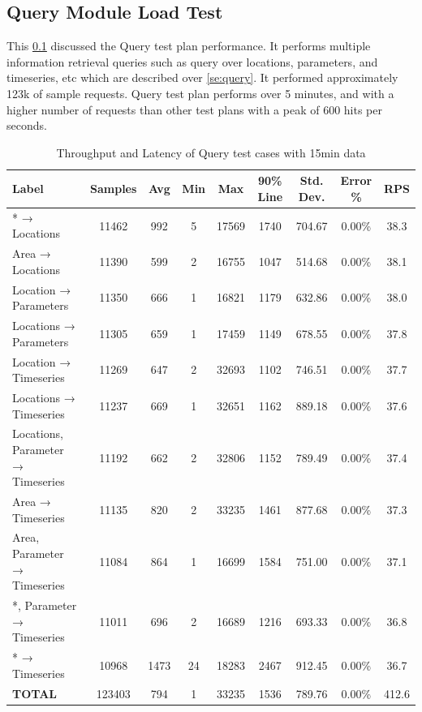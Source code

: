 \subsection{Query Module Load Test}
\label{subse:obs_test_plan_query_15min}

This \cref{subse:obs_test_plan_query_15min} discussed the Query test plan performance. It performs multiple information retrieval queries such as query over locations, parameters, and timeseries, etc which are described over \cref{se:query}. It performed approximately 123k of sample requests.
Query test plan performs over 5 minutes, and with a higher number of requests than other test plans with a peak of 600 hits per seconds.

\begin{table}[ht]
\caption{Throughput and Latency of Query test cases with 15min data}
\footnotesize
\begin{tabulary}{\linewidth}{|L|C|C|C|C|C|C|C|C|}
\hline
Label & Samples & Avg & Min & Max & 90\% Line & Std. Dev. & Error \% & RPS \\ \hline
* → Locations & 11462 & 992 & 5 & 17569 & 1740 & 704.67 & 0.00\% & 38.3 \\ \hline
Area → Locations & 11390 & 599 & 2 & 16755 & 1047 & 514.68 & 0.00\% & 38.1 \\ \hline
Location → Parameters & 11350 & 666 & 1 & 16821 & 1179 & 632.86 & 0.00\% & 38.0 \\ \hline
Locations → Parameters & 11305 & 659 & 1 & 17459 & 1149 & 678.55 & 0.00\% & 37.8 \\ \hline
Location → Timeseries & 11269 & 647 & 2 & 32693 & 1102 & 746.51 & 0.00\% & 37.7 \\ \hline
Locations → Timeseries & 11237 & 669 & 1 & 32651 & 1162 & 889.18 & 0.00\% & 37.6 \\ \hline
Locations, Parameter → Timeseries & 11192 & 662 & 2 & 32806 & 1152 & 789.49 & 0.00\% & 37.4 \\ \hline
Area → Timeseries & 11135 & 820 & 2 & 33235 & 1461 & 877.68 & 0.00\% & 37.3 \\ \hline
Area, Parameter → Timeseries & 11084 & 864 & 1 & 16699 & 1584 & 751.00 & 0.00\% & 37.1 \\ \hline
*, Parameter → Timeseries & 11011 & 696 & 2 & 16689 & 1216 & 693.33 & 0.00\% & 36.8 \\ \hline
* → Timeseries & 10968 & 1473 & 24 & 18283 & 2467 & 912.45 & 0.00\% & 36.7 \\ \hline
\textbf{TOTAL} & 123403 & 794 & 1 & 33235 & 1536 & 789.76 & 0.00\% & 412.6 \\ \hline
\end{tabulary}
\label{tab:obs_query_15_min_summary}
\end{table}

